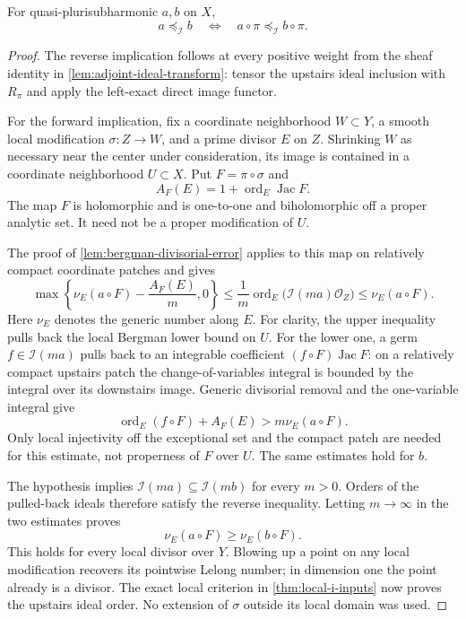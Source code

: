 \begin{lemma}\label{lem:birational-ideal-order}
For quasi-plurisubharmonic $a,b$ on $X$,
\[
 a\preceq_{\mathcal I}b
 \quad\Longleftrightarrow\quad
 a\circ\pi\preceq_{\mathcal I}b\circ\pi.
\]
\end{lemma}
\begin{proof}
The reverse implication follows at every positive weight from the sheaf identity in \cref{lem:adjoint-ideal-transform}: tensor the upstairs ideal inclusion with $R_\pi$ and apply the left-exact direct image functor.

For the forward implication, fix a coordinate neighborhood $W\subset Y$, a smooth local modification $\sigma:Z\to W$, and a prime divisor $E$ on $Z$. Shrinking $W$ as necessary near the center under consideration, its image is contained in a coordinate neighborhood $U\subset X$. Put $F=\pi\circ\sigma$ and
\[
 A_F(E)=1+\operatorname{ord}_E\operatorname{Jac}F.
\]
The map $F$ is holomorphic and is one-to-one and biholomorphic off a proper analytic set. It need not be a proper modification of $U$.

The proof of \cref{lem:bergman-divisorial-error} applies to this map on relatively compact coordinate patches and gives
\[
 \max\left\{\nu_E(a\circ F)-\frac{A_F(E)}m,0\right\}
 \leq \frac1m\operatorname{ord}_E\bigl(\mathcal I(ma)\mathcal O_Z\bigr)
 \leq\nu_E(a\circ F).
\]
Here $\nu_E$ denotes the generic number along $E$. For clarity, the upper inequality pulls back the local Bergman lower bound on $U$. For the lower one, a germ $f\in\mathcal I(ma)$ pulls back to an integrable coefficient $(f\circ F)\operatorname{Jac}F$: on a relatively compact upstairs patch the change-of-variables integral is bounded by the integral over its downstairs image. Generic divisorial removal and the one-variable integral give
\[
 \operatorname{ord}_E(f\circ F)+A_F(E)>m\nu_E(a\circ F).
\]
Only local injectivity off the exceptional set and the compact patch are needed for this estimate, not properness of $F$ over $U$. The same estimates hold for $b$.

The hypothesis implies $\mathcal I(ma)\subseteq\mathcal I(mb)$ for every $m>0$. Orders of the pulled-back ideals therefore satisfy the reverse inequality. Letting $m\to\infty$ in the two estimates proves
\[
 \nu_E(a\circ F)\geq\nu_E(b\circ F).
\]
This holds for every local divisor over $Y$. Blowing up a point on any local modification recovers its pointwise Lelong number; in dimension one the point already is a divisor. The exact local criterion in \cref{thm:local-i-inputs} now proves the upstairs ideal order. No extension of $\sigma$ outside its local domain was used.
\end{proof}

